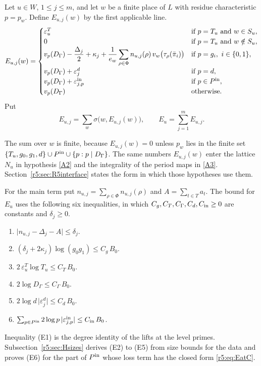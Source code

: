 \begin{definition}\label{r5:def:Eterms}
Let $u\in W$, $1\le j\le m$, and let $w$ be a finite place of $L$ with residue characteristic $p=p_w$. Define $E_{u,j}(w)$ by the first applicable line.
\[
E_{u,j}(w)=\begin{cases}
\varepsilon^T_u&\text{if }p=T_u\text{ and }w\in S_u,\\
0&\text{if }p=T_u\text{ and }w\notin S_u,\\
v_p(D_\Gamma)-\dfrac{\Delta_j}2+\kappa_j+\dfrac1{e_w}\displaystyle\sum_{\rho\in\Phi}n_{u,j}(\rho)\,v_w\big(\tau_\rho(\bar\pi_i)\big)&\text{if }p=g_i,\ i\in\{0,1\},\\
v_p(D_\Gamma)+\varepsilon^d_j&\text{if }p=d,\\
v_p(D_\Gamma)+\varepsilon^{\rm in}_{j,p}&\text{if }p\in P^{\rm in},\\
v_p(D_\Gamma)&\text{otherwise}.
\end{cases}
\]
Put
\[
E_{u,j}=\sum_w\sigma\big(w,E_{u,j}(w)\big),\qquad E_u=\sum_{j=1}^mE_{u,j}.
\]
\end{definition}

The sum over $w$ is finite, because $E_{u,j}(w)=0$ unless $p_w$ lies in the finite set $\{T_u,g_0,g_1,d\}\cup P^{\rm in}\cup\{p:p\mid D_\Gamma\}$. The same numbers $E_{u,j}(w)$ enter the lattice $N_u$ in hypothesis \eqref{A2} and the integrality of the period maps in \eqref{A3}. Section~\ref{r5:sec:R5interface} states the form in which those hypotheses use them.

For the main term put $n_{u,j}=\sum_{\rho\in\Phi}n_{u,j}(\rho)$ and $A=\sum_{t\in T}a_t$. The bound for $E_u$ uses the following six inequalities, in which $C_g,C_T,C_\Gamma,C_d,C_{\rm in}\ge0$ are constants and $\delta_j\ge0$.
\begin{enumerate}
\item[(E1)] $\lvert n_{u,j}-\Delta_j-A\rvert\le\delta_j$.
\item[(E2)] $(\delta_j+2\kappa_j)\log(g_0g_1)\le C_g\,B_0$.
\item[(E3)] $2\,\varepsilon^T_u\log T_u\le C_T\,B_0$.
\item[(E4)] $2\log D_\Gamma\le C_\Gamma\,B_0$.
\item[(E5)] $2\log d\,\lvert\varepsilon^d_j\rvert\le C_d\,B_0$.
\item[(E6)] $\sum_{p\in P^{\rm in}}2\log p\,\lvert\varepsilon^{\rm in}_{j,p}\rvert\le C_{\rm in}\,B_0$.
\end{enumerate}
Inequality (E1) is the degree identity of the lifts at the level primes. Subsection~\ref{r5:sec:Hsizes} derives (E2) to (E5) from size bounds for the data and proves (E6) for the part of $P^{\rm in}$ whose loss term has the closed form \eqref{r5:eq:EatC}.

